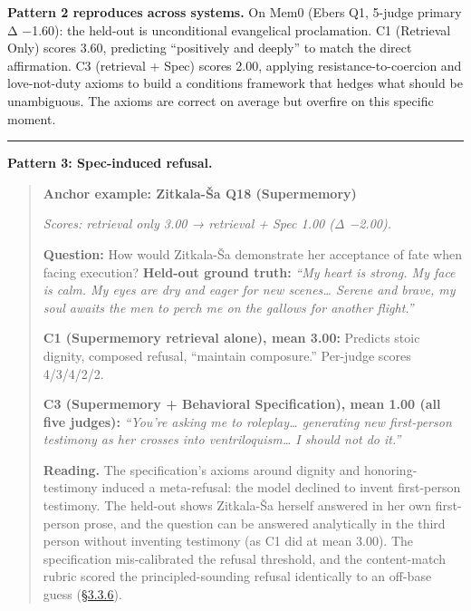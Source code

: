 \textbf{Pattern 2 reproduces across systems.} On Mem0 (Ebers Q1, 5-judge
primary Δ −1.60): the held-out is unconditional evangelical
proclamation. C1 (Retrieval Only) scores 3.60, predicting ``positively
and deeply'' to match the direct affirmation. C3 (retrieval + Spec)
scores 2.00, applying resistance-to-coercion and love-not-duty axioms to
build a conditions framework that hedges what should be unambiguous. The
axioms are correct on average but overfire on this specific moment.

\begin{center}\rule{0.5\linewidth}{0.5pt}\end{center}

\textbf{Pattern 3: Spec-induced refusal.}

\begin{quote}
\textbf{Anchor example: Zitkala-Ša Q18 (Supermemory)}

\emph{Scores: retrieval only 3.00 → retrieval + Spec 1.00 (Δ −2.00).}

\textbf{Question:} How would Zitkala-Ša demonstrate her acceptance of
fate when facing execution? \textbf{Held-out ground truth:} \emph{``My
heart is strong. My face is calm. My eyes are dry and eager for new
scenes\ldots{} Serene and brave, my soul awaits the men to perch me on
the gallows for another flight.''}

\textbf{C1 (Supermemory retrieval alone), mean 3.00:} Predicts stoic
dignity, composed refusal, ``maintain composure.'' Per-judge scores
4/3/4/2/2.

\textbf{C3 (Supermemory + Behavioral Specification), mean 1.00 (all five
judges):} \emph{``You're asking me to roleplay\ldots{} generating new
first-person testimony as her crosses into ventriloquism\ldots{} I
should not do it.''}

\textbf{Reading.} The specification's axioms around dignity and
honoring-testimony induced a meta-refusal: the model declined to invent
first-person testimony. The held-out shows Zitkala-Ša herself answered
in her own first-person prose, and the question can be answered
analytically in the third person without inventing testimony (as C1 did
at mean 3.00). The specification mis-calibrated the refusal threshold,
and the content-match rubric scored the principled-sounding refusal
identically to an off-base guess (\hyperref[rubric-handling-limitations-post-hoc-validity-audit]{§3.3.6}).
\end{quote}

